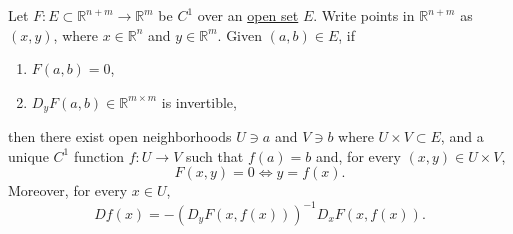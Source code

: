 	\begin{theorem}
	  \label{thm:implicit-function-theorem}
		Let $F: E \subset \mathbb{R}^{n + m} \to \mathbb{R}^m$ be $C^1$ over an \hyperref[pst-def:open-set]{open set} $E$. Write points in $\mathbb{R}^{n + m}$ as $(x,y)$, where $x \in \mathbb{R}^n$ and $y \in \mathbb{R}^m$. Given $(a, b) \in E$, if 
		\begin{enumerate}
			\item $F(a,b) = 0$, 
			\item $D_y F(a,b) \in \mathbb{R}^{m \times m}$ is invertible,
		\end{enumerate}
		then there exist open neighborhoods $U \ni a$ and $V \ni b$ where $U \times V \subset E$, and a unique $C^1$ function $f: U \to V$ such that $f(a) = b$ and, for every $(x, y) \in U \times V$,
		\begin{equation}
			F(x,y) = 0 \iff y = f(x).
		\end{equation}
		Moreover, for every $x \in U$,
		\begin{equation}
			Df(x) = - \left(D_yF(x,f(x))\right)^{-1} D_xF(x,f(x)).
		\end{equation}
	\end{theorem}
